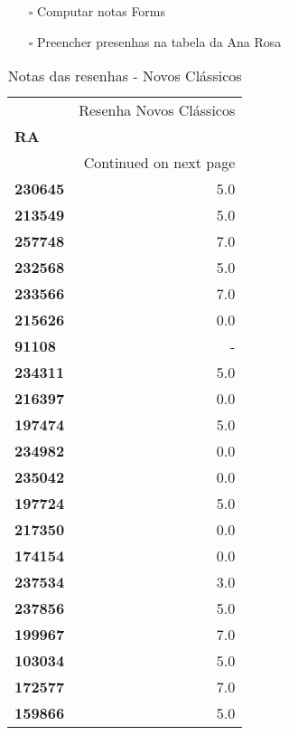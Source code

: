 \documentclass[11pt]{article}
\begin{document}
\begin{itemize}
\item[{$\square$}] Computar notas Forms
\item[{$\square$}] Preencher presenhas na tabela da Ana Rosa
\end{itemize}
\begin{center}
\begin{longtable}{lr}
\caption{Notas das resenhas - Novos Clássicos}\\
\toprule
{} &  Resenha Novos Clássicos \\
\textbf{RA    } &                          \\
\midrule
\endhead
\midrule
\multicolumn{2}{r}{{Continued on next page}} \\
\midrule
\endfoot

\bottomrule
\endlastfoot
\textbf{230645} &                      5.0 \\
\textbf{213549} &                      5.0 \\
\textbf{257748} &                      7.0 \\
\textbf{232568} &                      5.0 \\
\textbf{233566} &                      7.0 \\
\textbf{215626} &                      0.0 \\
\textbf{91108 } &                        - \\
\textbf{234311} &                      5.0 \\
\textbf{216397} &                      0.0 \\
\textbf{197474} &                      5.0 \\
\textbf{234982} &                      0.0 \\
\textbf{235042} &                      0.0 \\
\textbf{197724} &                      5.0 \\
\textbf{217350} &                      0.0 \\
\textbf{174154} &                      0.0 \\
\textbf{237534} &                      3.0 \\
\textbf{237856} &                      5.0 \\
\textbf{199967} &                      7.0 \\
\textbf{103034} &                      5.0 \\
\textbf{172577} &                      7.0 \\
\textbf{159866} &                      5.0 \\

\end{longtable}
\end{center}
\end{document}
